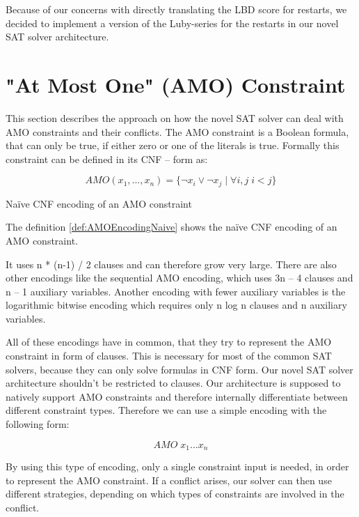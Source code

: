Because of our concerns with directly translating the LBD score for restarts, we decided to implement a version of the Luby-series for the restarts in our novel SAT solver architecture.

\section{"At Most One" (AMO) Constraint}
\label{sec:AMOConstraint}

This section describes the approach on how the novel SAT solver can deal with AMO constraints and their conflicts. The AMO constraint is a Boolean formula, that can only be true, if either zero or one of the literals is true.  Formally this constraint can be defined in its CNF – form as:

\begin{definition}
\begin{leftbar}
\begin{displaymath}
AMO(x_1, ..., x_n)= \{\neg x_i \vee \neg x_j \; | \; \forall i, j \; i < j\}
\end{displaymath}
\end{leftbar}
\caption{Naïve CNF encoding of an AMO constraint \cite{biere2009handbook}}
\label{def:AMOEncodingNaive}
\end{definition}

The definition \ref{def:AMOEncodingNaive} shows the naïve CNF encoding of an AMO constraint. 

It uses n * (n-1) / 2 clauses and can therefore grow very large. There are also other encodings like the sequential AMO encoding, which uses 3n – 4 clauses and n – 1 auxiliary variables. Another encoding with fewer auxiliary variables is the logarithmic bitwise encoding which requires only n log n clauses and n auxiliary variables. 
\cite{chen2010new} 

All of these encodings have in common, that they try to represent the AMO constraint in form of clauses. This is necessary for most of the common SAT solvers, because they can only solve formulas in CNF form. Our novel SAT solver architecture shouldn’t be restricted to clauses. Our architecture is supposed to natively support AMO constraints and therefore internally differentiate between different constraint types. Therefore we can use a simple encoding with the following form:

\begin{leftbar}
\begin{displaymath}
AMO \; x_1 ... x_n
\end{displaymath}
\end{leftbar}
By using this type of encoding, only a single constraint input is needed, in order to represent the AMO constraint. If a conflict arises, our solver can then use different strategies, depending on which types of constraints are involved in the conflict.

